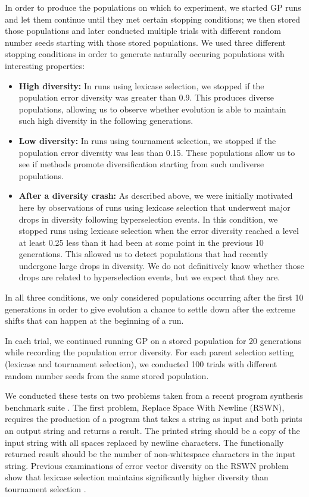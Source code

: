 \documentclass{sig-alternate-05-2015}
\begin{document}
In order to produce the populations on which to experiment, we started GP runs and let them continue until they met certain stopping conditions; we then stored those populations and later conducted multiple trials with different random number seeds starting with those stored populations. We used three different stopping conditions in order to generate naturally occuring populations with interesting properties:
\begin{itemize}
\item {\bf High diversity:}
In runs using lexicase selection, we stopped if the population error diversity was greater than 0.9. This produces  diverse populations, allowing us to observe whether evolution is able to maintain such high diversity in the following generations.

\item {\bf Low diversity:}
In runs using tournament selection, we stopped if the population error diversity was less than 0.15. These populations allow us to see if methods promote diversification starting from such undiverse populations.

\item {\bf After a diversity crash:}
As described above, we were initially motivated here by observations of runs using lexicase selection that underwent major drops in diversity following hyperselection events. In this condition, we stopped runs using lexicase selection when the error diversity reached a level at least 0.25 less than it had been at some point in the previous 10 generations. This allowed us to detect populations that had recently undergone large drops in diversity. We do not definitively know whether those drops are related to hyperselection events, but we expect that they are.

\end{itemize}
In all three conditions, we only considered populations occurring after the first 10 generations in order to give evolution a chance to settle down after the extreme shifts that can happen at the beginning of a run.

In each trial, we continued running GP on a stored population for 20 generations while recording the population error diversity. For each parent selection setting (lexicase and tournament selection), we conducted 100 trials with different random number seeds from the same stored population.

We conducted these tests on two problems taken from a recent program synthesis benchmark suite \cite{Helmuth:2015:GECCO}. The first problem, Replace Space With Newline (RSWN), requires the production of a program that takes a string as input and both prints an output string and returns a result. The printed string should be a copy of the input string with all spaces replaced by newline characters. The functionally returned result should be the number of non-whitespace characters in the input string. Previous examinations of error vector diversity on the RSWN problem show that lexicase selection maintains significantly higher diversity than tournament selection \cite{Helmuth:2015:GPTP}.
\end{document}
